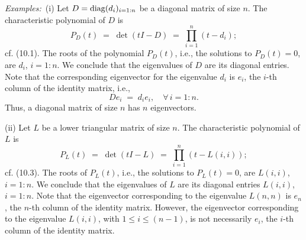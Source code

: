 \par\medskip\noindent\textit{Examples:}\ (i) Let $D = \operatorname{diag}(d_i)_{i=1:n}$ be a diagonal
matrix of size $n$. The characteristic polynomial of $D$ is
\[
P_D(t) \;=\; \det(tI-D) \;=\; \prod_{i=1}^n (t-d_i);
\]
cf. (10.1). The roots of the polynomial $P_D(t)$, i.e., the solutions to $P_D(t) = 0$,
are $d_i$, $i = 1:n$. We conclude that the eigenvalues of $D$ are its diagonal entries.
Note that the corresponding eigenvector for the eigenvalue $d_i$ is $e_i$, the $i$-th
column of the identity matrix, i.e.,
\[
De_i \;=\; d_ie_i, \quad \forall\, i = 1:n.
\]
Thus, a diagonal matrix of size $n$ has $n$ eigenvectors.

(ii) Let $L$ be a lower triangular matrix of size $n$. The characteristic polynomial of
$L$ is
\[
P_L(t) \;=\; \det(tI-L) \;=\; \prod_{i=1}^n (t-L(i,i));
\]
cf. (10.3). The roots of $P_L(t)$, i.e., the solutions to $P_L(t) = 0$, are $L(i,i)$,
$i = 1:n$. We conclude that the eigenvalues of $L$ are its diagonal entries $L(i,i)$,
$i = 1:n$. Note that the eigenvector corresponding to the eigenvalue $L(n,n)$ is $e_n$,
the $n$-th column of the identity matrix. However, the eigenvector corresponding to the
eigenvalue $L(i,i)$, with $1 \le i \le (n-1)$, is not necessarily $e_i$, the $i$-th
column of the identity matrix.
